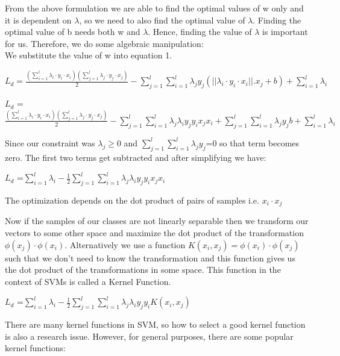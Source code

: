 \documentclass[hidelinks,11pt]{article}
\begin{document}
	From the above formulation we are able to find the optimal values of w only and it is dependent on $\lambda$, so we need to  also find the optimal value of $\lambda$. Finding the optimal value of b needs both w and $\lambda$. Hence, finding the value of $\lambda$ is important for us. Therefore, we do some algebraic manipulation:
	\\

	We substitute the value of w into equation 1. 

	\begin{center}
	$L_d = \frac{ (\sum_{i=1}^l\lambda_i \cdot y_i \cdot x_i)(\sum_{j=1}^l\lambda_j \cdot y_j \cdot x_j)}{2}-\sum_{j=1}^l\sum_{i=1}^l\lambda_j y_j(||\lambda_i \cdot y_i \cdot x_i||.x_j+b)+\sum_{i=1}^l \lambda_i$
	\end{center}
	\begin{center}
	    $L_d$ =$ \frac{(\sum_{i=1}^l\lambda_i \cdot y_i \cdot x_i)(\sum_{j=1}^l\lambda_j \cdot y_j \cdot x_j)}{2}-\sum_{j=1}^l\sum_{i=1}^l\lambda_j\lambda_i y_j y_i x_j x_i+\sum_{j=1}^l\sum_{i=1}^l\lambda_j y_j b+\sum_{i=1}^l \lambda_i$
	\end{center}
	Since our constraint was $\lambda_j \geq 0$ and $\sum_{j=1}^l\sum_{i=1}^l\lambda_j y_j$=0 so that term becomes zero. The first two terms get subtracted and after simplifying we have:
	\begin{center}
	    $L_d$ =$ \sum_{i=1}^l \lambda_i-\frac{1}{2}\sum_{j=1}^l\sum_{i=1}^l\lambda_j\lambda_i y_j y_i x_j x_i$
	\end{center}
	The optimization depends on the dot product of pairs of samples i.e. $x_i \cdot x_j$

	Now if the samples of our classes are not linearly separable then we transform our vectors to some other space and maximize the dot product of the transformation $\phi(x_j)\cdot\phi(x_i)$. Alternatively we use a function $K(x_i,x_j)=\phi(x_i)\cdot\phi(x_j)$ such that we don't need to know the transformation and this function gives us the dot product of the transformations in some space. This function in the context of SVMs is called a Kernel Function.
	\begin{center}
	    $L_d$ =$ \sum_{i=1}^l \lambda_i-\frac{1}{2}\sum_{j=1}^l\sum_{i=1}^l\lambda_j\lambda_i y_j y_i K(x_i, x_j)$
	\end{center}
	There are many kernel functions in SVM, so how to select a good kernel function is also a research issue. However, for general purposes, there are some popular kernel functions:\\
\end{document}
